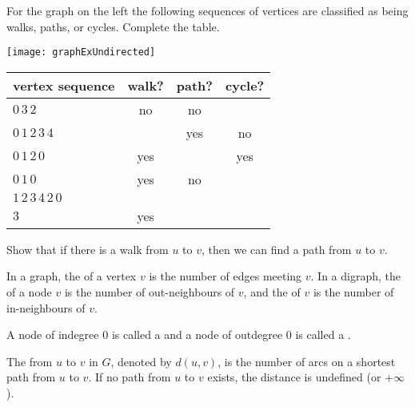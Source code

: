 \begin{Boxample}
For the graph on the left the following
sequences of vertices are classified as being walks, paths, or cycles. Complete the table.\\

\begin{minipage}[c]{0.3\textwidth}
\centering
\texttt{[image: graphExUndirected]}
\end{minipage}
\begin{minipage}[c]{0.65\textwidth}
\begin{tabular}{|l|c|c|c|}\hline
\textbf{vertex sequence} & \textbf{walk?} & \textbf{path?} & \textbf{cycle?} \\ \hline
$0\, 3\, 2$                  & no  & no  &   \\
$0\, 1\, 2\, 3\, 4$          &     & yes & no  \\
$0\, 1\,  2\,  0$            & yes &     & yes  \\
$0 \, 1\,  0$                & yes & no  &  \\
$1\,  2\,  3\,  4\,  2\,  0$ &     &     &  \\
$3$							 & yes &     &  \\
\hline
\end{tabular}
\end{minipage}
\end{Boxample}

\begin{Boxample}[7]
Show that if there is a walk from $u$ to $v$, then we can find a path from $u$ to $v$.
\end{Boxample}

\begin{Definition} 
In a graph, the  of a vertex $v$ is the number of edges meeting $v$. 
In a digraph, the  of a node $v$ is the number of out-neighbours of $v$, 
and the  of $v$ is the number of in-neighbours of $v$.

A node of indegree $0$ is called a  and a node of outdegree $0$ is called a .
\end{Definition}


\begin{Definition}
The  from $u$ to $v$ in $G$, denoted by $d(u,v)$, is 
the number of arcs on a shortest path from $u$ to $v$. If no path from $u$ to $v$ exists, the 
distance is undefined (or $+\infty$).
\end{Definition}

